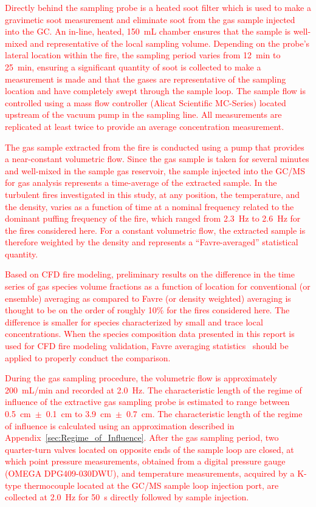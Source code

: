 \documentclass[12pt]{article}
\begin{document}
\textcolor{red}{Directly behind the sampling probe is a heated soot filter which is used to make a gravimetic soot measurement and eliminate soot from the gas sample injected into the GC. An in-line, heated, 150~mL chamber ensures that the sample is well-mixed and representative of the local sampling volume. Depending on the probe's lateral location within the fire, the sampling period varies from \SI{12}{min} to \SI{25}{min}, ensuring a significant quantity of soot is collected to make a measurement is made and that the gases are representative of the sampling location and have completely swept through the sample loop. The sample flow is controlled using a mass flow controller (Alicat Scientific MC-Series) located upstream of the vacuum pump in the sampling line. All measurements are replicated at least twice to provide an average concentration measurement.}

\textcolor{red}{The gas sample extracted from the fire is conducted using a pump that provides a near-constant volumetric flow. Since the gas sample is taken for several minutes and well-mixed in the sample gas reservoir, the sample injected into the GC/MS for gas analysis represents a time-average of the extracted sample. In the turbulent fires investigated in this study, at any position, the temperature, and the density, varies as a function of time at a nominal frequency related to the dominant puffing frequency of the fire, which ranged from \SI{2.3}{\hertz} to \SI{2.6}{\hertz} for the fires considered here. For a constant volumetric flow, the extracted sample is therefore weighted by the density and represents a “Favre-averaged” statistical quantity.}

\textcolor{red}{Based on CFD fire modeling, preliminary results on the difference in the time series of gas species volume fractions as a function of location for conventional (or ensemble) averaging as compared to Favre (or density weighted) averaging is thought to be on the order of roughly 10\% for the fires considered here. The difference is smaller for species characterized by small and trace local concentrations. When the species composition data presented in this report is used for CFD fire modeling validation, Favre averaging statistics~\cite{bilger1975note} should be applied to properly conduct the comparison.}

\textcolor{red}{During the gas sampling procedure, the volumetric flow is approximately 200~mL/min and recorded at \SI{2.0}{\hertz}. The characteristic length of the regime of influence of the extractive gas sampling probe is estimated to range between 0.5~cm~$\pm$~0.1~cm to 3.9~cm~$\pm$~0.7~cm. The characteristic length of the regime of influence is calculated using an approximation described in Appendix~\ref{sec:Regime_of_Influence}. After the gas sampling period, two quarter-turn valves located on opposite ends of the sample loop are closed, at which point pressure measurements, obtained from a digital pressure gauge (OMEGA DPG409-030DWU), and temperature measurements, acquired by a K-type thermocouple located at the GC/MS sample loop injection port, are collected at \SI{2.0}{\hertz} for \SI{50}{s} directly followed by sample injection.}
\end{document}
